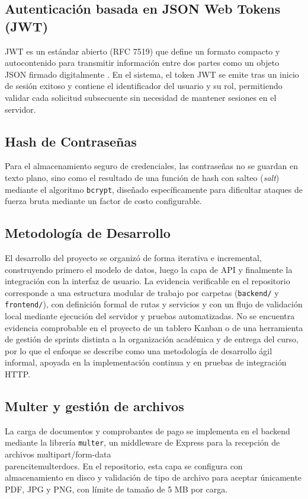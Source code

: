 \subsection{Autenticación basada en JSON Web Tokens (JWT)}
JWT es un estándar abierto (RFC 7519) que define un formato compacto y
autocontenido para transmitir información entre dos partes como un objeto
JSON firmado digitalmente \parencite{rfc7519}. En el sistema, el token JWT se
emite tras un inicio de sesión exitoso y contiene el identificador del
usuario y su rol, permitiendo validar cada solicitud subsecuente sin
necesidad de mantener sesiones en el servidor.

\subsection{Hash de Contraseñas}
Para el almacenamiento seguro de credenciales, las contraseñas no se guardan
en texto plano, sino como el resultado de una función de hash con salteo
(\emph{salt}) mediante el algoritmo \texttt{bcrypt}, diseñado específicamente
para dificultar ataques de fuerza bruta mediante un factor de costo
configurable.

\subsection{Metodología de Desarrollo}
El desarrollo del proyecto se organizó de forma iterativa e incremental,
construyendo primero el modelo de datos, luego la capa de API y finalmente la
integración con la interfaz de usuario. La evidencia verificable en el
repositorio corresponde a una estructura modular de trabajo por carpetas
(\texttt{backend/} y \texttt{frontend/}), con definición formal de rutas y
servicios y con un flujo de validación local mediante ejecución del servidor y
pruebas automatizadas. No se encuentra evidencia comprobable en el proyecto de
un tablero Kanban o de una herramienta de gestión de sprints distinta a la
organización académica y de entrega del curso, por lo que el enfoque se
describe como una metodología de desarrollo ágil informal, apoyada en la
implementación continua y en pruebas de integración HTTP.

\subsection{Multer y gestión de archivos}
La carga de documentos y comprobantes de pago se implementa en el backend
mediante la librería \texttt{multer}, un middleware de Express para la
recepción de archivos multipart/form-data \\parencite{multerdocs}. En el
repositorio, esta capa se configura con almacenamiento en disco y validación de
tipo de archivo para aceptar únicamente PDF, JPG y PNG, con límite de tamaño de
5 MB por carga.
